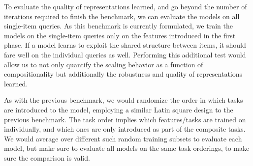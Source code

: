 To evaluate the quality of representations learned, and go beyond the number of iterations required to finish the benchmark, we can evaluate the models on all single-item queries. As this benchmark is currently formulated, we train the models on the single-item queries only on the features introduced in the first phase. If a model learns to exploit the shared structure between items, it should fare well on the individual queries as well. Performing this additional test would allow us to not only quantify the scaling behavior as a function of compositionality but additionally the robustness and quality of representations learned. 

As with the previous benchmark, we would randomize the order in which tasks are introduced to the model, employing a similar Latin square design to the previous benchmark. The task order implies which features/tasks are trained on individually, and which ones are only introduced as part of the composite tasks. We would average over different such random training subsets to evaluate each model, but make sure to evaluate all models on the same task orderings, to make sure the comparison is valid. 
